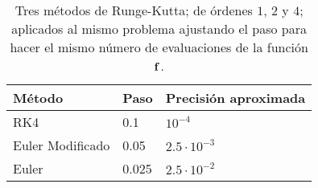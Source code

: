 \begin{table}[H]
    \centering
    \begin{tabular}{|l|l|l|}
        \hline
    Método           & Paso  & Precisión aproximada \\
        \hline
        \hline
    RK4              & 0.1   & $10^{-4}$ \\
        \hline
    Euler Modificado & 0.05  & $2.5\cdot 10^{-3}$ \\
        \hline
    Euler            & 0.025 & $2.5\cdot 10^{-2}$ \\
        \hline
    \end{tabular}
    \caption{Tres métodos de Runge-Kutta;
        de órdenes $1$, $2$ y $4$;
        aplicados al mismo problema ajustando el paso
        para hacer el mismo número de evaluaciones de la función $\vb{f}{}$.
    }
    \label{tab:order-vs-step}
\end{table}

